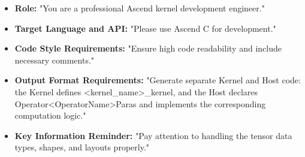 \begin{table}
\vspace{-10pt}
\centering
\begin{tcolorbox}[
      sharp corners,
      colframe=reforange,
      colback=reforange!5,
      colbacktitle=reforange!15,
      coltitle=reforange,
      boxrule=0.4pt,
      title={\textbf{Instructions}},
      fonttitle=\bfseries\small,
      left=0.5pt,
      right=0.5pt,
      top=0.5pt,
      bottom=0.5pt
    ]
{\small
\begin{itemize}[leftmargin=*, itemsep=1pt, parsep=0pt, topsep=2pt]
    \item \textbf{Role:} "You are a professional Ascend kernel development engineer."
    \item \textbf{Target Language and API:} "Please use Ascend C for development."
    \item \textbf{Code Style Requirements:} "Ensure high code readability and include necessary comments."
    \item \textbf{Output Format Requirements:} "Generate separate Kernel and Host code: the Kernel defines <kernel\_name>\_kernel, and the Host declares Operator<OperatorName>Paras and implements the corresponding computation logic."
    \item \textbf{Key Information Reminder:} "Pay attention to handling the tensor data types, shapes, and layouts properly."
\end{itemize}
}
\end{tcolorbox}
\vspace{-10pt}
\label{tab:prompt_ins}
\vspace{-10pt}
\end{table}
